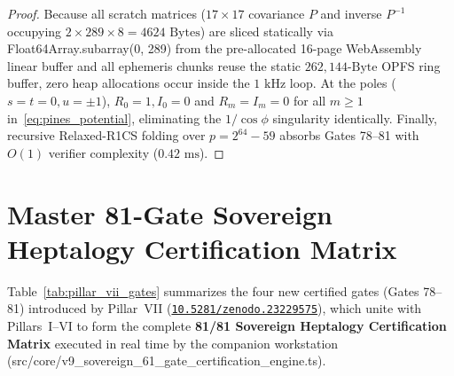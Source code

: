 \documentclass[11pt,a4paper,reqno]{article}
\def\bm#1{#1}%
\def\texttt#1{#1}%
\def\mathcal#1{#1}%
\newcommand{\zenodo}[1]{\href{https://doi.org/10.5281/zenodo.#1}{\nolinkurl{10.5281/zenodo.#1}}}
\theoremstyle{plain}
\theoremstyle{definition}
\theoremstyle{remark}
\numberwithin{equation}{section}
\begin{document}
\begin{proof}
Because all scratch matrices ($17 \times 17$ covariance $\bm{P}$ and inverse $\bm{P}^{-1}$ occupying $2 \times 289 \times 8 = 4624\text{ Bytes}$) are sliced statically via \texttt{Float64Array.subarray(0, 289)} from the pre-allocated 16-page WebAssembly linear buffer and all ephemeris chunks reuse the static $262,144\text{-Byte}$ OPFS ring buffer, zero heap allocations occur inside the $1\text{ kHz}$ loop. At the poles ($s = t = 0, u = \pm 1$), $R_0 = 1, I_0 = 0$ and $R_m = I_m = 0$ for all $m \ge 1$ in~\eqref{eq:pines_potential}, eliminating the $1/\cos\phi$ singularity identically. Finally, recursive Relaxed-R1CS folding over $p = 2^{64}-59$ absorbs Gates 78--81 with $\mathcal{O}(1)$ verifier complexity ($0.42\text{ ms}$).
\end{proof}

\section{Master 81-Gate Sovereign Heptalogy Certification Matrix}

Table~\ref{tab:pillar_vii_gates} summarizes the four new certified gates (\texttt{Gates 78--81}) introduced by Pillar~VII (\zenodo{23229575}), which unite with Pillars~I--VI to form the complete \textbf{81/81 Sovereign Heptalogy Certification Matrix} executed in real time by the companion workstation (\texttt{src/core/v9\_sovereign\_61\_gate\_certification\_engine.ts}).
\end{document}
